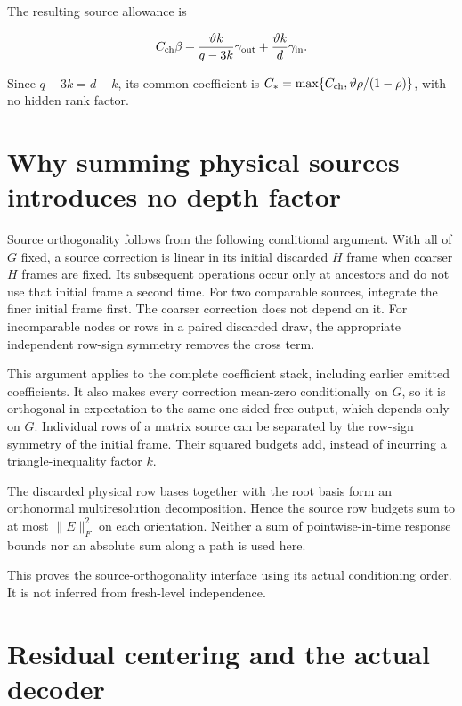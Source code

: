 \documentclass[11pt,oneside,openany,a4paper]{book}
\numberwithin{equation}{chapter}
\theoremstyle{definition}
\theoremstyle{remark}
\begin{document}
The resulting source allowance is

\[
C_{\rm ch}\beta+
\frac{\vartheta k}{q-3k}\gamma_{\rm out}
+\frac{\vartheta k}{d}\gamma_{\rm in}.
\]

Since \(q-3k=d-k\), its common coefficient is \(C_*=\max\{C_{\rm ch},\vartheta\rho/(1-\rho)\}\), with no hidden rank factor.

\section{Why summing physical sources introduces no depth factor}\label{interfaces:why-summing-physical-sources-introduces-no-depth-factor}

Source orthogonality follows from the following conditional argument. With all of \(G\) fixed, a source correction is linear in its initial discarded \(H\) frame when coarser \(H\) frames are fixed. Its subsequent operations occur only at ancestors and do not use that initial frame a second time. For two comparable sources, integrate the finer initial frame first. The coarser correction does not depend on it. For incomparable nodes or rows in a paired discarded draw, the appropriate independent row-sign symmetry removes the cross term.

This argument applies to the complete coefficient stack, including earlier emitted coefficients. It also makes every correction mean-zero conditionally on \(G\), so it is orthogonal in expectation to the same one-sided free output, which depends only on \(G\). Individual rows of a matrix source can be separated by the row-sign symmetry of the initial frame. Their squared budgets add, instead of incurring a triangle-inequality factor \(k\).

The discarded physical row bases together with the root basis form an orthonormal multiresolution decomposition. Hence the source row budgets sum to at most \(\|E\|_F^2\) on each orientation. Neither a sum of pointwise-in-time response bounds nor an absolute sum along a path is used here.

This proves the source-orthogonality interface using its actual conditioning order. It is not inferred from fresh-level independence.

\section{Residual centering and the actual decoder}\label{interfaces:residual-centering-and-the-actual-decoder}
\end{document}
